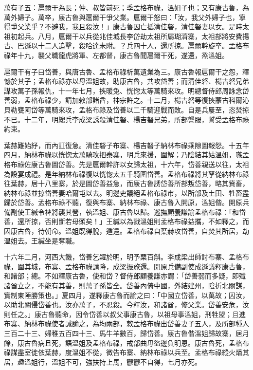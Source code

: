 \begin{pinyinscope}
萬有子五：扈爾干為長；仲、叔皆前死；季孟格布祿，溫姐子也；又有康古魯，為萬外婦子。萬卒，康古魯與扈爾干爭父業。扈爾干怒曰：「汝，我父外婦子也，寧得爭父業乎？不避我，我且殺汝！」康古魯因亡抵清佳砮，清佳砮妻以女。是時太祖初起兵。八月，扈爾干以兵從兆佳城長李岱劫太祖所屬瑚濟寨，太祖部將安費揚古、巴遜以十二人追擊，殺哈達未附。？兵四十人，還所掠。扈爾幹旋卒。孟格布祿年十九，襲父職龍虎將軍、左都督，康古魯聞扈爾干死，遂還，烝溫姐。

扈爾干有子曰岱善，與唐古魯、孟格布祿析萬遺業為三。康古魯報扈爾干之怨，釋憾於其子；孟格布祿亦以母溫姐故，助康古魯，共攻岱善；而清佳砮、楊吉砮兄弟謀攻萬子孫報仇，十一年七月，挾暖兔、恍惚太等萬騎來攻。明總督侍郎周詠念岱善弱，孟格布祿少，請加敕部諸酋，神宗許之。十二月，楊吉砮等復挾蒙古科爾沁貝勒甕阿岱等萬騎來攻，孟格布祿及岱善以二千騎迎戰而敗。自是兵屢至，恣焚掠不已。十二年，明總兵李成梁誘殺清佳砮、楊吉砮兄弟，所部讋服，誓受孟格布祿約束。

葉赫難始紓，而內訌復急。清佳砮子布寨、楊吉砮子納林布祿乘隙圖報怨。十五年四月，納林布祿以恍惚太萬騎攻把泰寨，明兵來援，圍解；乃陰結其姑溫姐，嗾孟格布祿佐康古魯圖岱善。先是扈爾幹許以女歸太祖，十六年，岱善親送以往，太祖為設宴成禮。是年納林布祿復以恍惚太五千騎圍岱善。孟格布祿將其孥從納林布祿往葉赫，居十八里寨，於是圖岱善益急，而康古魯誘岱善所部叛岱善，略其貲畜，納林布祿並掠岱善妻哈爾屯以去。明邊吏議絕孟格布祿市，以所部及土田、牲畜盡歸於岱善。孟格布祿不聽，復與布寨、納林布祿、康古魯入開原，溫姐偕。開原兵備副使王緘令裨將襲其營，執溫姐、康古魯以歸。巡撫顧養謙諭孟格布祿：「和岱善，還所掠，否則斷若母頭矣！」王緘以為戮溫姐則孟格布祿益攜，不如釋之，而囚康古魯，待朝命。溫姐既得脫，遁還。孟格布祿自葉赫攻岱善，自焚其所居，劫溫姐去。王緘坐是奪職。

十六年二月，河西大饑，岱善乞糴於明，明予粟百斛。李成梁出師討布寨、孟格布祿，圍其城，布寨、孟格布祿請降，成梁振旅還。開原兵備副使成遜議釋康古魯，和諸部；總。不如釋康古魯，使和岱？督侍郎顧養謙亦謂：「岱善弱而多疑，即殲諸酋立之，不能有其善，則萬子孫皆全。岱善內倚中國，外結建州，陰折北關謀，實制東陲勝策也。」夏四月，遂釋康古魯而諭之曰：「中國立岱善，以萬故；囚汝，以助北關侵岱善也。汝亦萬子，不忍殺。今釋汝，和諸酋，修父業。岱善安危，汝則任之。」康古魯聽命，因令岱善以叔父事康古魯，以祖母事溫姐，刑牲盟；且進布寨、納林布祿使者誡諭之，為均兩部，敕孟格布祿出岱善妻子五人，及所部種人三百二十三、婦稚五百四十三、馬牛羊數百，歸岱善。康古魯偕溫姐歸故寨，居月餘，康古魯病且死，語溫姐及孟格布祿，戒部曲毋盜邊負明恩。康古魯死，孟格布祿謀盡室徙依葉赫，度溫姐不從，微告布寨、納林布祿以兵至。孟格布祿縱火燔其居，趣溫姐行，溫姐不可，強扶持上馬，鬱鬱不自得，七月亦死。


\end{pinyinscope}
